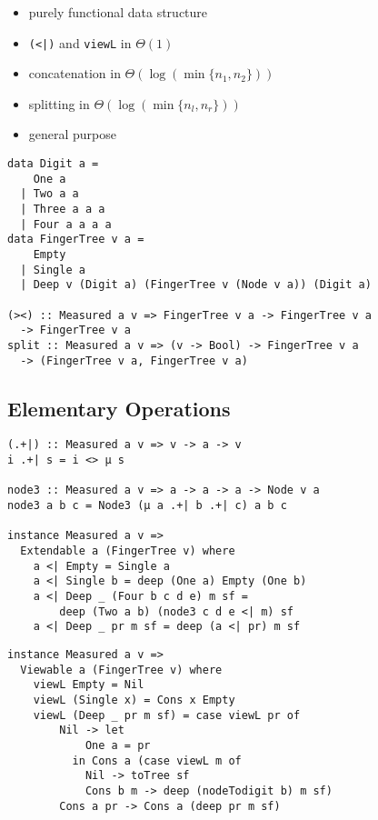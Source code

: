 \begin{frame}
  \begin{itemize}[<+->]
    \item purely functional data structure
    \item \texttt{(<|)} and \texttt{viewL} in \(\Theta(1)\)
    \item concatenation in \(\Theta(\log(\min\{n_1,n_2\}))\)
    \item splitting in \(\Theta(\log(\min\{n_l,n_r\}))\)
    \item general purpose
  \end{itemize}
\end{frame}


\begin{frame}[fragile]
\begin{verbatim}
data Digit a =
    One a 
  | Two a a 
  | Three a a a 
  | Four a a a a
data FingerTree v a =
    Empty
  | Single a
  | Deep v (Digit a) (FingerTree v (Node v a)) (Digit a)

(><) :: Measured a v => FingerTree v a -> FingerTree v a
  -> FingerTree v a
split :: Measured a v => (v -> Bool) -> FingerTree v a 
  -> (FingerTree v a, FingerTree v a)
  \end{verbatim}
\end{frame}

\subsection{Elementary Operations}
\begin{frame}[fragile]
  \begin{verbatim}
(.+|) :: Measured a v => v -> a -> v
i .+| s = i <> μ s

node3 :: Measured a v => a -> a -> a -> Node v a
node3 a b c = Node3 (μ a .+| b .+| c) a b c

instance Measured a v =>
  Extendable a (FingerTree v) where
    a <| Empty = Single a
    a <| Single b = deep (One a) Empty (One b)
    a <| Deep _ (Four b c d e) m sf =
        deep (Two a b) (node3 c d e <| m) sf
    a <| Deep _ pr m sf = deep (a <| pr) m sf
  \end{verbatim}
\end{frame}


\begin{frame}[fragile]
  \begin{verbatim}
instance Measured a v => 
  Viewable a (FingerTree v) where
    viewL Empty = Nil
    viewL (Single x) = Cons x Empty
    viewL (Deep _ pr m sf) = case viewL pr of
        Nil -> let 
            One a = pr 
          in Cons a (case viewL m of
            Nil -> toTree sf
            Cons b m -> deep (nodeTodigit b) m sf)
        Cons a pr -> Cons a (deep pr m sf)
  \end{verbatim}
\end{frame}

